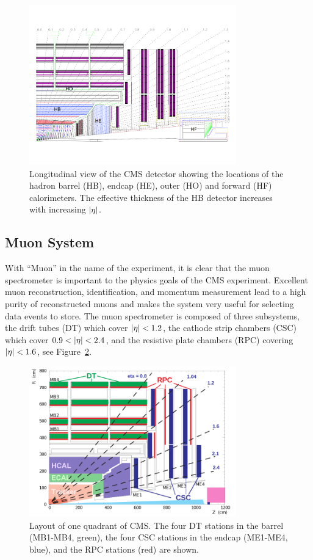 \begin{figure}[htbp]
\centering
     \includegraphics[width=0.8\textwidth]{cms_and_lhc/plots/cms_hcal.pdf}
     \caption{
Longitudinal view of the CMS detector showing the locations of the hadron 
barrel (HB), endcap (HE), outer (HO) and forward (HF) calorimeters. The
effective thickness of the HB detector increases with increasing $\lvert\eta\rvert$.
     }
     \label{fig:cms_hcal}
\end{figure}




\subsection{Muon System}
With ``Muon'' in the name of the experiment, it is clear that the muon spectrometer
is important to the physics goals of the CMS experiment. Excellent muon reconstruction, 
identification, and momentum measurement lead to a high purity of reconstructed
muons and makes the system very useful for selecting data events to store.
The muon spectrometer is composed of three subsystems, the drift tubes (DT) which cover
$\lvert\eta\rvert < 1.2$, the cathode strip chambers (CSC) which cover $0.9 < \lvert\eta\rvert < 2.4$, and
the resistive plate chambers (RPC) covering $\lvert\eta\rvert < 1.6$, see Figure~\ref{fig:cms_muon_syst}.

\begin{figure}[htbp]
\centering
     \includegraphics[width=0.8\textwidth]{cms_and_lhc/plots/cms_muon_syst.png}
     \caption{
Layout of one quadrant of CMS. The four DT stations in the barrel (MB1-MB4, green), the four CSC stations in the endcap (ME1-ME4, blue), and the RPC stations (red) are shown.
     }
     \label{fig:cms_muon_syst}
\end{figure}

